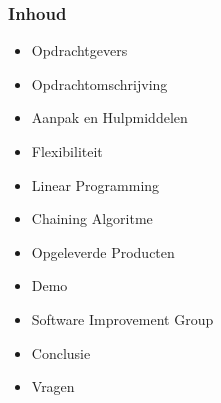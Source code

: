 \begin{frame}\frametitle{Inhoud}
    \begin{itemize}
        \item Opdrachtgevers
        \item Opdrachtomschrijving 
        \item Aanpak en Hulpmiddelen
        \item Flexibiliteit
        \item Linear Programming
        \item Chaining Algoritme
        \item Opgeleverde Producten
        \item Demo
        \item Software Improvement Group
        \item Conclusie
        \item Vragen
    \end{itemize}
\end{frame}

